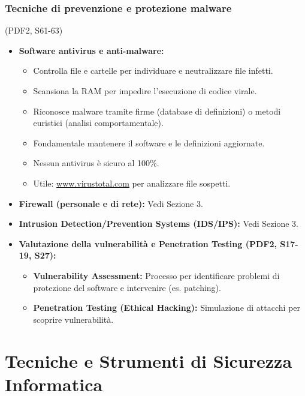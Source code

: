 \documentclass{beamer}
\begin{document}
\begin{frame}
  \frametitle{Tecniche di prevenzione e protezione malware}
  (PDF2, S61-63)
  \begin{itemize}
    \item \textbf{Software antivirus e anti-malware:}
    \begin{itemize}
        \item Controlla file e cartelle per individuare e neutralizzare file infetti.
        \item Scansiona la RAM per impedire l'esecuzione di codice virale.
        \item Riconosce malware tramite firme (database di definizioni) o metodi euristici (analisi comportamentale).
        \item \alert{Fondamentale mantenere il software e le definizioni aggiornate.}
        \item Nessun antivirus è sicuro al 100\%.
        \item Utile: \url{www.virustotal.com} per analizzare file sospetti.
    \end{itemize}
    \item \textbf{Firewall (personale e di rete):} Vedi Sezione 3.
    \item \textbf{Intrusion Detection/Prevention Systems (IDS/IPS):} Vedi Sezione 3.
    \item \textbf{Valutazione della vulnerabilità e Penetration Testing (PDF2, S17-19, S27):}
    \begin{itemize}
        \item \textbf{Vulnerability Assessment:} Processo per identificare problemi di protezione del software e intervenire (es. patching).
        \item \textbf{Penetration Testing (Ethical Hacking):} Simulazione di attacchi per scoprire vulnerabilità.
    \end{itemize}
  \end{itemize}
\end{frame}

\section{Tecniche e Strumenti di Sicurezza Informatica}
\end{document}
